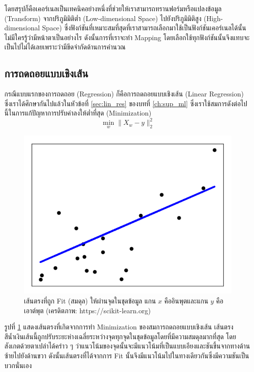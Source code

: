 \vspace{1em}

โดยสรุปก็คือเคอร์เนลเป็นเทคนิคอย่างหนึ่งที่ช่วยให้เราสามารถทรานฟอร์มหรือแปลงข้อมูล (Transform) จากปริภูมิมิติต่ำ (Low-dimensional Space) ไปยังปริภูมิมิติสูง (High-dimensional Space) ซึ่งฟังก์ชันที่เหมาะสมที่สุดที่เราสามารถเลือกมาใช้เป็นฟังก์ชันเคอร์เนลได้นั้นไม่มีใครรู้ว่ามีหน้าตาเป็นอย่างไร ดังนั้นการที่เราจะทำ Mapping โดยเลือกใช้ทุกฟังก์ชันนั้นจึงแทบจะเป็นไปไม่ได้เลยเพราะว่ามีขีดจำกัดด้านการคำนวณ

\subsection{การถดถอยแบบเชิงเส้น}
\label{ssec:lin_reg}

กรณีแบบแรกของการถดถอย (Regression) ก็คือการถดถอยแบบเชิงเส้น (Linear Regression) ซึ่งเราได้ศึกษากันไปแล้วในหัวข้อที่ \ref{sec:lin_res} ของบทที่ \ref{ch:sup_ml} ซึ่งเราใช้สมการดังต่อไปนี้ในการแก้ปัญหาการปรับค่าลงให้ต่ำที่สุด (Minimization)
%
\begin{equation}
    \min_{w} \lVert X_{w} - y \rVert_{2}^{2}
\end{equation}

\begin{figure}[H]
    \centering
    \includegraphics[width=0.45\linewidth]{fig/plot_linear_regression.png}
    \caption{เส้นตรงที่ถูก Fit (สมดุล) ให้ผ่านจุดในชุดข้อมูล แกน $x$ คืออินพุตและแกน $y$ คือเอาต์พุต (เครดิตภาพ: https://scikit-learn.org)}
    \label{fig:lin_res}
\end{figure}

รูปที่ \ref{fig:lin_res} แสดงเส้นตรงที่เกิดจากการทำ Minimization ของสมการถดถอยแบบเชิงเส้น เส้นตรงสีน้ำเงินเส้นนี้ถูกปรับระยะห่างเฉลี่ยระหว่างจุดทุกจุดในชุดข้อมูลโดยที่มีความสมดุลมากที่สุด โดยสังเกตด้วยตาเปล่าได้คร่าว ๆ ว่าแนวโน้มของจุดนั้นจะมีแนวโน้มที่เป็นแบบเอียงและชันขึ้นจากทางด้านซ้ายไปยังด้านขวา ดังนั้นเส้นตรงที่ได้จากการ Fit นั้นจึงมีแนวโน้มไปในทางเดียวกันซึ่งมีความชันเป็นบวกนั่นเอง

